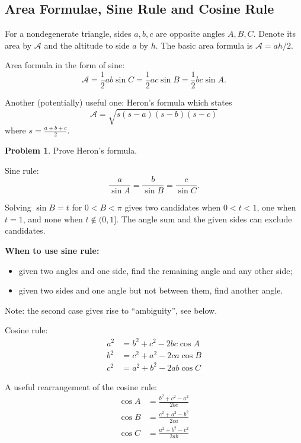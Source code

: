 \documentclass[11pt]{article}
\theoremstyle{definition}
\newtheorem{problem}[theorem]{Problem}
\theoremstyle{remark}
\newcommand{\pqty}[1]{\left(#1\right)}
\begin{document}
\subsection{Area Formulae, Sine Rule and Cosine Rule}\label{tmua-3-subsection-001}
For a nondegenerate triangle, sides \(a,b,c\) are opposite angles \(A,B,C\). Denote its area by \(\mathcal{A}\) and the altitude to side \(a\) by \(h\). The basic area formula is \(\mathcal{A}=ah/2\).

Area formula in the form of sine:
\[
    \mathcal{A} = \frac{1}{2} ab \sin C = \frac{1}{2} ac \sin B = \frac{1}{2} bc \sin A.
\]

Another (potentially) useful one: Heron's formula which states
\[
    \mathcal{A} = \sqrt{s \pqty{s - a} \pqty{s - b} \pqty{s - c}}
\]
where \(s = \frac{a + b + c}{2}\).

\begin{problem}\label{tmua-3-unit-003}
    Prove Heron's formula.
\end{problem}

Sine rule:
\[
    \frac{a}{\sin A} = \frac{b}{\sin B} = \frac{c}{\sin C}.
\]

Solving \(\sin B=t\) for \(0<B<\pi\) gives two candidates when \(0<t<1\), one when \(t=1\), and none when \(t\notin(0,1]\). The angle sum and the given sides can exclude candidates.

\textbf{When to use sine rule:}
\begin{itemize}
    \item given two angles and one side, find the remaining angle and any other side;
    \item given two sides and one angle but not between them, find another angle.
\end{itemize}

Note: the second case gives rise to ``ambiguity'', see below.

Cosine rule:
\begin{align*}
    a^2 &= b^2 + c^2 - 2bc \cos A \\
    b^2 &= c^2 + a^2 - 2ca \cos B \\
    c^2 &= a^2 + b^2 - 2ab \cos C
\end{align*}

A useful rearrangement of the cosine rule:
\begin{align*}
    \cos A &= \frac{b^2 + c^2 - a^2}{2bc} \\
    \cos B &= \frac{c^2 + a^2 - b^2}{2ca} \\
    \cos C &= \frac{a^2 + b^2 - c^2}{2ab}
\end{align*}
\end{document}
